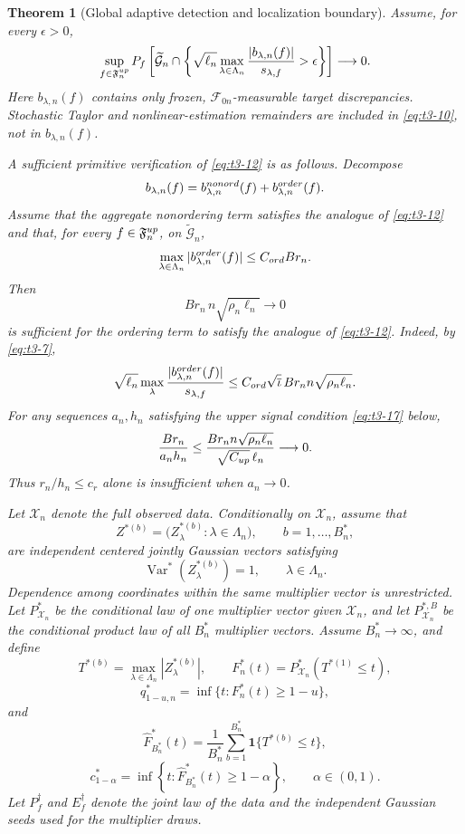 \documentclass[10pt,a4paper]{amsart}
\newtheorem{theorem}{Theorem}
\begin{document}
\begin{theorem}[Global adaptive detection and localization boundary]
Assume, for every \(\epsilon>0\),
\begin{equation}
\sup_{f\in\mathfrak F_n^{\rm up}}
P_f\left[
\widetilde{\mathcal G}_n
\cap
\left\{
\sqrt{\ell_n}
\max_{\lambda\in\Lambda_n}
\frac{|b_{\lambda,n}(f)|}{s_{\lambda,f}}
>\epsilon
\right\}
\right]
\longrightarrow0.
\label{eq:t3-12}
\end{equation}
Here \(b_{\lambda,n}(f)\) contains only frozen,
\(\mathcal F_{0n}\)-measurable target discrepancies.  Stochastic
Taylor and nonlinear-estimation remainders are included in
\eqref{eq:t3-10}, not in \(b_{\lambda,n}(f)\).

A sufficient primitive verification of \eqref{eq:t3-12} is as
follows.  Decompose
\[
b_{\lambda,n}(f)
=
b_{\lambda,n}^{\rm nonord}(f)
+
b_{\lambda,n}^{\rm order}(f).
\]
Assume that the aggregate nonordering term satisfies the analogue of
\eqref{eq:t3-12} and that, for every
\(f\in\mathfrak F_n^{\rm up}\), on
\(\widetilde{\mathcal G}_n\),
\[
\max_{\lambda\in\Lambda_n}
|b_{\lambda,n}^{\rm order}(f)|
\le
C_{\rm ord}Br_n.
\]
Then
\begin{equation}
Br_n\,n\sqrt{\rho_n\ell_n}
\longrightarrow0
\label{eq:t3-13}
\end{equation}
is sufficient for the ordering term to satisfy the analogue of
\eqref{eq:t3-12}.  Indeed, by \eqref{eq:t3-7},
\[
\sqrt{\ell_n}
\max_\lambda
\frac{|b_{\lambda,n}^{\rm order}(f)|}{s_{\lambda,f}}
\le
C_{\rm ord}\sqrt{\overline\iota}\,
Br_n n\sqrt{\rho_n\ell_n}.
\]
For any sequences \(a_n,h_n\) satisfying the upper signal condition
\eqref{eq:t3-17} below,
\[
\frac{Br_n}{a_n h_n}
\le
\frac{
Br_n n\sqrt{\rho_n\ell_n}
}{
\sqrt{C_{\rm up}}\,\ell_n
}
\longrightarrow0.
\]
Thus \(r_n/h_n\le c_r\) alone is insufficient when \(a_n\to0\).

Let \(\mathcal X_n\) denote the full observed data.  Conditionally on
\(\mathcal X_n\), assume that
\[
Z^{*(b)}
=
\bigl(
Z_\lambda^{*(b)}:
\lambda\in\Lambda_n
\bigr),
\qquad b=1,\ldots,B_n^*,
\]
are independent centered jointly Gaussian vectors satisfying
\begin{equation}
\operatorname{Var}^*(Z_\lambda^{*(b)})=1,
\qquad
\lambda\in\Lambda_n.
\label{eq:t3-14}
\end{equation}
Dependence among coordinates within the same multiplier vector is
unrestricted.  Let \(P_{\mathcal X_n}^*\) be the conditional law of
one multiplier vector given \(\mathcal X_n\), and let
\(P_{\mathcal X_n}^{*,B}\) be the conditional product law of all
\(B_n^*\) multiplier vectors.  Assume \(B_n^*\to\infty\), and define
\[
T^{*(b)}
=
\max_{\lambda\in\Lambda_n}|Z_\lambda^{*(b)}|,
\qquad
F_n^*(t)
=
P_{\mathcal X_n}^*(T^{*(1)}\le t),
\]
\[
q_{1-u,n}^*
=
\inf\{t:F_n^*(t)\ge1-u\},
\]
and
\[
\widehat F_{B_n^*}^*(t)
=
\frac1{B_n^*}
\sum_{b=1}^{B_n^*}
\mathbf 1\{T^{*(b)}\le t\},
\]
\[
c_{1-\alpha}^*
=
\inf\left\{
t:
\widehat F_{B_n^*}^*(t)\ge1-\alpha
\right\},
\qquad
\alpha\in(0,1).
\]
Let \(P_f^\dagger\) and \(E_f^\dagger\) denote the joint law of the
data and the independent Gaussian seeds used for the multiplier
draws.


\end{theorem}
\end{document}
